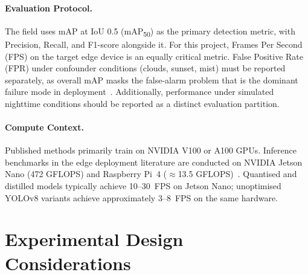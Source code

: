 \documentclass[11pt,twocolumn]{article}
\begin{document}
\paragraph{Evaluation Protocol.}
The field uses mAP at IoU 0.5 (mAP\textsubscript{50}) as the primary
detection metric, with Precision, Recall, and F1-score alongside it.
For this project, Frames Per Second (FPS) on the target edge device
is an equally critical metric. False Positive Rate (FPR) under
confounder conditions (clouds, sunset, mist) must be reported
separately, as overall mAP masks the false-alarm problem that is the
dominant failure mode in deployment~\cite{benchmarking2024}.
Additionally, performance under simulated nighttime conditions
should be reported as a distinct evaluation partition.

\paragraph{Compute Context.}
Published methods primarily train on NVIDIA V100 or A100 GPUs.
Inference benchmarks in the edge deployment literature are conducted
on NVIDIA Jetson Nano (472 GFLOPS) and Raspberry Pi~4
($\approx$13.5 GFLOPS)~\cite{kd2025, firenet2019}. Quantised and
distilled models typically achieve 10--30~FPS on Jetson Nano;
unoptimised YOLOv8 variants achieve approximately 3--8~FPS on the
same hardware.

\section*{Experimental Design Considerations}
\label{sec:expdesign}
\end{document}
